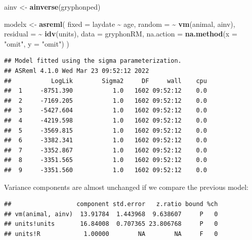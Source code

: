 \documentclass[
  12pt,
]{book}
\newenvironment{Shaded}{\begin{snugshade}}{\end{snugshade}}
\newcommand{\DataTypeTok}[1]{\textcolor[rgb]{0.13,0.29,0.53}{#1}}
\newcommand{\KeywordTok}[1]{\textcolor[rgb]{0.13,0.29,0.53}{\textbf{#1}}}
\newcommand{\NormalTok}[1]{#1}
\newcommand{\OperatorTok}[1]{\textcolor[rgb]{0.81,0.36,0.00}{\textbf{#1}}}
\newcommand{\StringTok}[1]{\textcolor[rgb]{0.31,0.60,0.02}{#1}}
\begin{document}
\begin{Shaded}
\begin{Highlighting}[]
\NormalTok{ainv \textless{}{-}}\StringTok{ }\KeywordTok{ainverse}\NormalTok{(gryphonped)}

\NormalTok{modelx \textless{}{-}}\StringTok{ }\KeywordTok{asreml}\NormalTok{(}
  \DataTypeTok{fixed =}\NormalTok{ laydate }\OperatorTok{\textasciitilde{}}\StringTok{ }\NormalTok{age,}
  \DataTypeTok{random =} \OperatorTok{\textasciitilde{}}\StringTok{ }\KeywordTok{vm}\NormalTok{(animal, ainv),}
  \DataTypeTok{residual =} \OperatorTok{\textasciitilde{}}\StringTok{ }\KeywordTok{idv}\NormalTok{(units),}
  \DataTypeTok{data =}\NormalTok{ gryphonRM,}
  \DataTypeTok{na.action =} \KeywordTok{na.method}\NormalTok{(}\DataTypeTok{x =} \StringTok{"omit"}\NormalTok{, }\DataTypeTok{y =} \StringTok{"omit"}\NormalTok{)}
\NormalTok{)}
\end{Highlighting}
\end{Shaded}

\begin{verbatim}
## Model fitted using the sigma parameterization.
## ASReml 4.1.0 Wed Mar 23 09:52:12 2022
##           LogLik        Sigma2     DF     wall    cpu
##  1     -8751.390           1.0   1602 09:52:12    0.0
##  2     -7169.205           1.0   1602 09:52:12    0.0
##  3     -5427.604           1.0   1602 09:52:12    0.0
##  4     -4219.598           1.0   1602 09:52:12    0.0
##  5     -3569.815           1.0   1602 09:52:12    0.0
##  6     -3382.341           1.0   1602 09:52:12    0.0
##  7     -3352.867           1.0   1602 09:52:12    0.0
##  8     -3351.565           1.0   1602 09:52:12    0.0
##  9     -3351.560           1.0   1602 09:52:12    0.0
\end{verbatim}

Variance components are almost unchanged if we compare the previous model:

\begin{Shaded}
\end{Shaded}

\begin{verbatim}
##                  component std.error   z.ratio bound %ch
## vm(animal, ainv)  13.91784  1.443968  9.638607     P   0
## units!units       16.84008  0.707365 23.806768     P   0
## units!R            1.00000        NA        NA     F   0
\end{verbatim}
\end{document}
